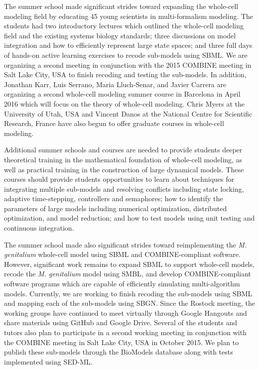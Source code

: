 \documentclass[journal,transmag]{IEEEtran}
\begin{document}
The summer school made significant strides toward expanding the whole-cell modeling field by educating 45 young scientists in multi-formalism modeling. 
The students had two introductory lectures which outlined the whole-cell modeling field and the existing systems biology standards; three discussions on model integration and how to efficiently represent large state spaces; and three full days of hands-on active learning exercises to recode sub-models using SBML. 
We are organizing a second meeting in conjunction with the 2015 COMBINE meeting in Salt Lake City, USA to finish recoding and testing the sub-models.
In addition, Jonathan Karr, Luis Serrano, Maria Lluch-Senar, and Javier Carrera are organizing a second whole-cell modeling summer course in Barcelona in April 2016 which will focus on the theory of whole-cell modeling. 
Chris Myers at the University of Utah, USA and Vincent Danos at the National Centre for Scientific Research, France have also begun to offer graduate courses in whole-cell modeling.

Additional summer schools and courses are needed to provide students deeper theoretical training in the mathematical foundation of whole-cell modeling, as well as practical training in the construction of large dynamical models. These courses should provide students opportunities to learn about techniques for integrating multiple sub-models and resolving conflicts including state locking, adaptive time-stepping, controllers and semaphores; how to identify the parameters of large models including numerical optimization, distributed optimization, and model reduction; and how to test models using unit testing and continuous integration. 

The summer school made also significant strides toward reimplementing the \textit{M. genitalium} whole-cell model using SBML and COMBINE-compliant software. However, significant work remains to expand SBML to support whole-cell models, recode the \textit{M. genitalium} model using SMBL, and develop COMBINE-compliant software programs which are capable of efficiently simulating multi-algorithm models. Currently, we are working to finish recoding the sub-models using SBML and mapping each of the sub-models using SBGN. Since the Rostock meeting, the working groups have continued to meet virtually through Google Hangouts and share materials using GitHub and Google Drive. Several of the students and tutors also plan to participate in a second working meeting in conjunction with the COMBINE meeting in Salt Lake City, USA in October 2015. We plan to publish these sub-models through the BioModels database along with tests implemented using SED-ML. 
\end{document}
